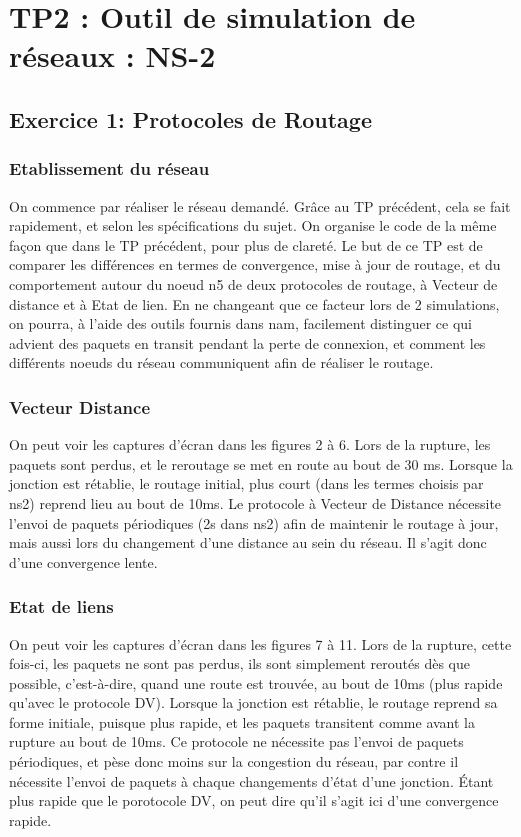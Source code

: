 \documentclass{article}
\begin{document}
\section{TP2 : Outil de simulation de réseaux : NS-2}

    \subsection{Exercice 1: Protocoles de Routage}
    \subsubsection{Etablissement du réseau}
      On commence par réaliser le réseau demandé. Grâce au TP précédent, cela se fait rapidement, et selon les spécifications du sujet. On organise le code de la même façon que dans le TP précédent, pour plus de clareté. Le but de ce TP est de comparer les différences en termes de convergence, mise à jour de routage, et du comportement autour du noeud n5 de deux protocoles de routage, à Vecteur de distance et à Etat de lien. En ne changeant que ce facteur lors de 2 simulations, on pourra, à l'aide des outils fournis dans nam, facilement distinguer ce qui advient des paquets en transit pendant la perte de connexion, et comment les différents noeuds du réseau communiquent afin de réaliser le routage.
    \subsubsection{Vecteur Distance}
      On peut voir les captures d'écran dans les figures 2 à 6. Lors de la rupture, les paquets sont perdus, et le reroutage se met en route au bout de 30 ms. Lorsque la jonction est rétablie, le routage initial, plus court (dans les termes choisis par ns2) reprend lieu au bout de 10ms. Le protocole à Vecteur de Distance nécessite l'envoi de paquets périodiques (2s dans ns2) afin de maintenir le routage à jour, mais aussi lors du changement d'une distance au sein du réseau. Il s'agit donc d'une convergence lente.
    \subsubsection{Etat de liens}
      On peut voir les captures d'écran dans les figures 7 à 11. Lors de la rupture, cette fois-ci, les paquets ne sont pas perdus, ils sont simplement reroutés dès que possible, c'est-à-dire, quand une route est trouvée, au bout de 10ms (plus rapide qu'avec le protocole DV). Lorsque la jonction est rétablie, le routage reprend sa forme initiale, puisque plus rapide, et les paquets transitent comme avant la rupture au bout de 10ms. Ce protocole ne nécessite pas l'envoi de paquets périodiques, et pèse donc moins sur la congestion du réseau, par contre il nécessite l'envoi de paquets à chaque changements d'état d'une jonction. Étant plus rapide que le porotocole DV, on peut dire qu'il s'agit ici d'une convergence rapide.
\end{document}
